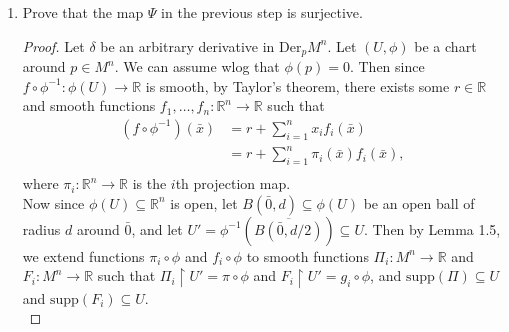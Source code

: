 \documentclass{article}
\begin{document}
\begin{enumerate}[label={\bf Q\arabic*:}]
\begin{enumerate}
      \item Prove that the map $\Psi$ in the previous step is surjective.
        \begin{proof}
          Let $\delta$ be an arbitrary derivative in $\text{Der}_pM^n$.
          Let $(U,\phi)$ be a chart around $p\in M^n$. We can assume wlog
          that $\phi(p)=0$. Then since
          $f\circ\phi^{-1}:\phi(U)\rightarrow\mathbb{R}$ is smooth, by
          Taylor's theorem, there exists some $r\in\mathbb{R}$ and smooth
          functions $f_1,\ldots,f_n:\mathbb{R}^n\rightarrow\mathbb{R}$ such
          that
          \begin{align*}
            (f\circ\phi^{-1})(\bar{x}) &=
              r+\sum_{i=1}^nx_if_i(\bar{x}) \\
            &=r+\sum_{i=1}^n\pi_i(\bar{x})f_i(\bar{x}), \\
          \end{align*}
          where $\pi_i:\mathbb{R}^n\rightarrow\mathbb{R}$ is the $i$th
          projection map. \\

          Now since $\phi(U)\subseteq\mathbb{R}^n$ is open, let
          $B(\bar{0},d)\subseteq\phi(U)$ be an open ball of radius $d$
          around $\bar{0}$, and let
          $U'=\phi^{-1}(\overline{B(\bar{0},d/2)})\subseteq U$. Then by
          Lemma 1.5, we extend functions $\pi_i\circ\phi$ and
          $f_i\circ\phi$ to smooth functions
          $\Pi_i:M^n\rightarrow\mathbb{R}$ and
          $F_i:M^n\rightarrow\mathbb{R}$ such that $\Pi_i\restriction
          U'=\pi\circ\phi$ and $F_i\restriction U'=g_i\circ\phi$, and
          $\text{supp}(\Pi)\subseteq U$ and $\text{supp}(F_i)\subseteq U$.
          \\


\end{proof}
\end{enumerate}
\end{enumerate}
\end{document}
